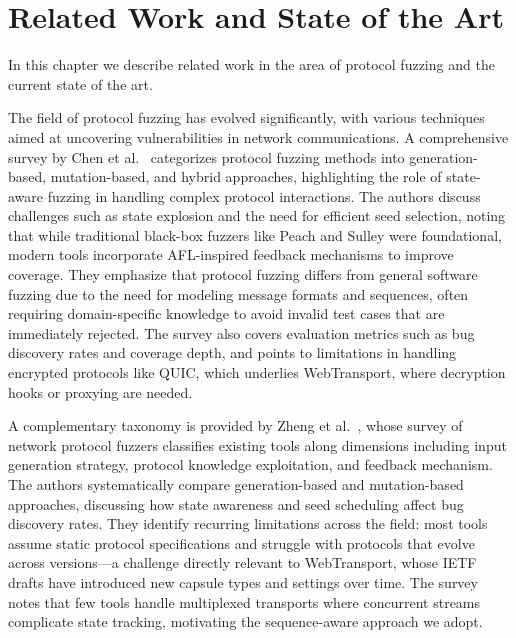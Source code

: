 \chapter{Related Work and State of the Art}
\label{chap:related}

In this chapter we describe related work in the area of protocol fuzzing and the current state of the art.

The field of protocol fuzzing has evolved significantly, with various techniques aimed at uncovering vulnerabilities in network communications. A comprehensive survey by Chen et al.~\cite{chen2024survey} categorizes protocol fuzzing methods into generation-based, mutation-based, and hybrid approaches, highlighting the role of state-aware fuzzing in handling complex protocol interactions. The authors discuss challenges such as state explosion and the need for efficient seed selection, noting that while traditional black-box fuzzers like Peach and Sulley were foundational, modern tools incorporate AFL-inspired feedback mechanisms to improve coverage. They emphasize that protocol fuzzing differs from general software fuzzing due to the need for modeling message formats and sequences, often requiring domain-specific knowledge to avoid invalid test cases that are immediately rejected. The survey also covers evaluation metrics such as bug discovery rates and coverage depth, and points to limitations in handling encrypted protocols like QUIC, which underlies WebTransport, where decryption hooks or proxying are needed.

A complementary taxonomy is provided by Zheng et al.~\cite{wang2024enhancing}, whose survey of network protocol fuzzers classifies existing tools along dimensions including input generation strategy, protocol knowledge exploitation, and feedback mechanism. The authors systematically compare generation-based and mutation-based approaches, discussing how state awareness and seed scheduling affect bug discovery rates. They identify recurring limitations across the field: most tools assume static protocol specifications and struggle with protocols that evolve across versions---a challenge directly relevant to WebTransport, whose IETF drafts have introduced new capsule types and settings over time. The survey notes that few tools handle multiplexed transports where concurrent streams complicate state tracking, motivating the sequence-aware approach we adopt.

